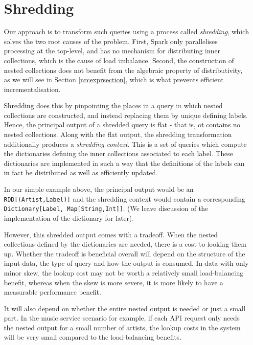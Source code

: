 \section{Shredding} {

Our approach is to transform such queries using a process called \textit{shredding}, which solves the two root causes of the problem. First, Spark only parallelises processing at the top-level, and has no mechanism for distributing inner collections, which is the cause of load imbalance.  Second, the construction of nested collections does not benefit from the algebraic property of distributivity, as we will see in Section \ref{nrcexprsection}, which is what prevents efficient incrementalisation.

Shredding does this by pinpointing the places in a query in which nested collections are constructed, and instead replacing them by unique defining labels. Hence, the principal output of a shredded query is flat - that is, ot contains no nested collections. Along with the flat output, the shredding transformation additionally produces a \textit{shredding context}. This is a set of queries which compute the dictionaries defining the inner collections associated to each label. These dictionaries are implemented in such a way that the definitions of the labels can in fact be distributed as well as efficiently updated.

In our simple example above, the principal output would be an \lstinline{RDD[(Artist,Label)]} and the shredding context would contain a corresponding \lstinline{Dictionary[Label, Map[String,Int]]}. (We leave discussion of the implementation of the dictionary for later).

However, this shredded output comes with a tradeoff. When the nested collections defined by the dictionaries are needed, there is a cost to looking them up. Whether the tradeoff is beneficial overall will depend on the structure of the input data, the type of query and how the output is consumed. In data with only minor skew, the lookup cost may not be worth a relatively small load-balancing benefit, whereas when the skew is more severe, it is more likely to have a measurable performance benefit.

It will also depend on whether the entire nested output is needed or just a small part. In the music service scenario for example, if each API request only needs the nested output for a small number of artists, the lookup costs in the system will be very small compared to the load-balancing benefits.

}
